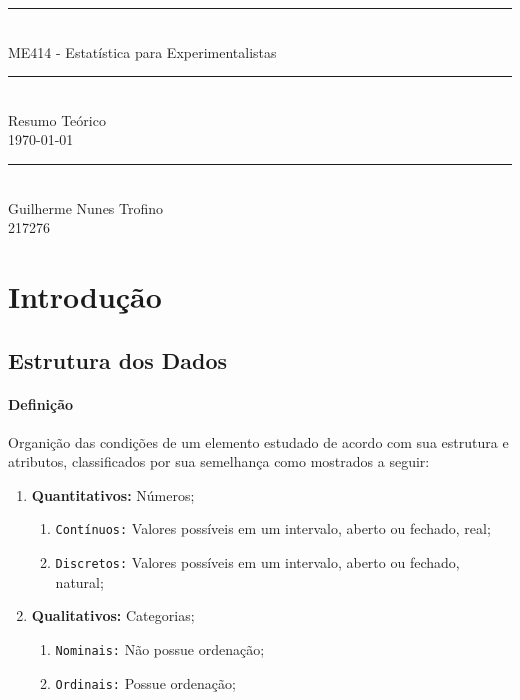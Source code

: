 \documentclass{article}
\begin{document}
    \begin{titlepage}
        \begin{center}
            \rule{450pt}{0.5pt}\\[4mm]
            {\Huge ME414 - Estatística para Experimentalistas}\\
            \rule{450pt}{0.5pt}\\[2mm]
            {\Large Resumo Teórico}\\[200mm]
            \today\\
            \rule{250pt}{0.5pt}\\
            {\large Guilherme Nunes Trofino}\\
            {\large 217276}\\
        \end{center}
    \end{titlepage}
\newpage

    \tableofcontents
\newpage

    \section{Introdução}
        \subsection{Estrutura dos Dados}
            \paragraph{Definição}Organição das condições de um elemento estudado de acordo com sua estrutura e atributos, classificados por sua semelhança como mostrados a seguir:
                \begin{enumerate}[noitemsep]
                    \item \textbf{Quantitativos:} Números;
                        \begin{enumerate}[noitemsep]
                            \item \texttt{Contínuos:} Valores possíveis em um intervalo, aberto ou fechado, real;
                            \item \texttt{Discretos:} Valores possíveis em um intervalo, aberto ou fechado, natural;
                        \end{enumerate}
                    \item \textbf{Qualitativos:} Categorias;
                        \begin{enumerate}[noitemsep]
                            \item \texttt{Nominais:} Não possue ordenação;
                            \item \texttt{Ordinais:} Possue ordenação;
                        \end{enumerate}
                \end{enumerate}
\end{document}
